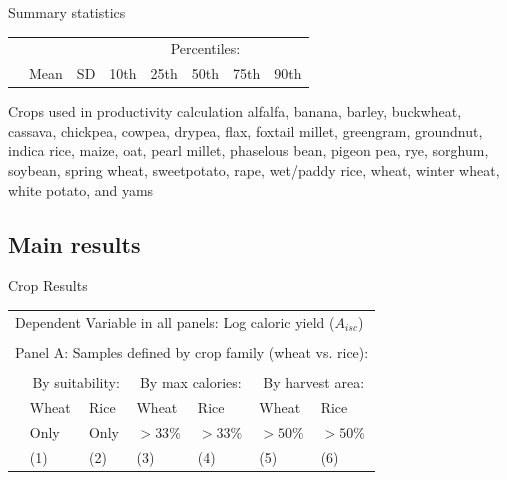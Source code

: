 \documentclass[10pt, xcolor=dvipsnames]{beamer}
\begin{document}
\begin{frame}{Summary statistics}\label{stats}
{\scriptsize
\begin{tabularx}{\textwidth}{lXXXXXXX}
\midrule
 &      &            & \multicolumn{5}{c}{Percentiles:} \\ \cmidrule{4-8}
 & Mean & SD  & 10th    & 25th    & 50th & 75th & 90th \\
\midrule

\midrule
\end{tabularx}
}

\hfill \hyperlink{data}{}
\end{frame}

\begin{frame}{Crops used in productivity calculation}\label{crops}
alfalfa, banana, barley, buckwheat, cassava, chickpea, cowpea, drypea, flax, foxtail millet, greengram, groundnut, indica rice, maize, oat, pearl millet, phaselous bean, pigeon pea, rye, sorghum, soybean, spring wheat, sweetpotato, rape, wet/paddy rice, wheat, winter wheat, white potato, and yams

\hfill \hyperlink{data}{}
\end{frame}

\subsection{Main results}


\begin{frame}{Crop Results}\label{cropreg}
{\footnotesize
\begin{tabularx}{\textwidth}{lXXXXXX}
\midrule
\multicolumn{7}{l}{Dependent Variable in all panels: Log caloric yield ($A_{isc}$)} \\ \\
\multicolumn{7}{l}{Panel A: Samples defined by crop family (wheat vs. rice):} \\ \\
 & \multicolumn{2}{c}{By suitability:} & \multicolumn{2}{c}{By max calories:} & \multicolumn{2}{c}{By harvest area:}\\ \cmidrule(lr){2-3} \cmidrule(lr){4-5} \cmidrule(lr){6-7} 
 & Wheat & Rice & Wheat  & Rice  & Wheat  & Rice \\
 & Only & Only &  $>33\%$ & $>33\%$ & $>50\%$ & $>50\%$   \\
 & (1) & (2) & (3) & (4) & (5) & (6) \\
\midrule

\midrule
\end{tabularx}
}

\hfill \hyperlink{crop}{}
\end{frame}
\end{document}
